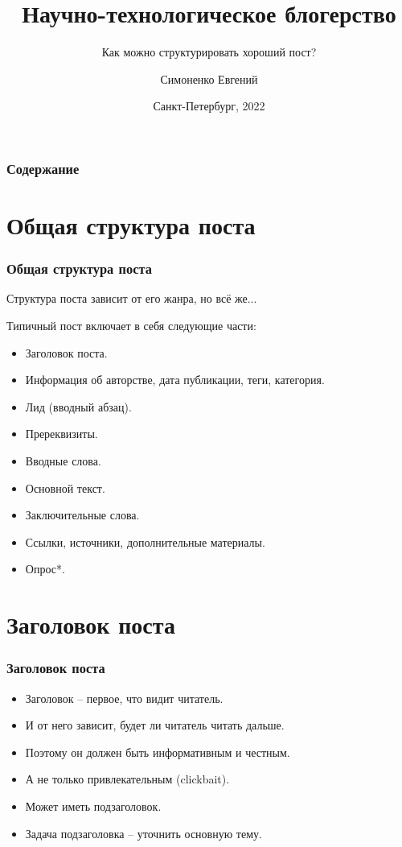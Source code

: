 \documentclass[12pt]{beamer}
\title[Блогерство]{Научно-технологическое блогерство}
\subtitle{Как можно структурировать хороший пост?}
\author[]{Симоненко Евгений}
\institute[]{Университет ИТМО}
\date[]{Санкт-Петербург, 2022}
\begin{document}
\begin{frame}
  \titlepage
\end{frame}

\begin{frame}
  \frametitle{Содержание}
  \tableofcontents
\end{frame}

\section{Общая структура поста}

\begin{frame}
  \frametitle{Общая структура поста}
  Структура поста зависит от его жанра, но всё же...

  Типичный пост включает в себя следующие части:
  \begin{itemize}
  \item Заголовок поста.
  \item Информация об авторстве, дата публикации, теги, категория.
  \item Лид (вводный абзац).
  \item Пререквизиты.
  \item Вводные слова.
  \item Основной текст.
  \item Заключительные слова.
  \item Ссылки, источники, дополнительные материалы.
  \item Опрос*.
  \end{itemize}
\end{frame}

\section{Заголовок поста}

\begin{frame}
  \frametitle{Заголовок поста}
  \begin{itemize}
  \item Заголовок -- первое, что видит читатель.
  \item И от него зависит, будет ли читатель читать дальше.
  \item Поэтому он должен быть информативным и честным.
  \item А не только привлекательным (clickbait).
  \item Может иметь подзаголовок.
  \item Задача подзаголовка -- уточнить основную тему.
  \end{itemize}
\end{frame}
\end{document}
